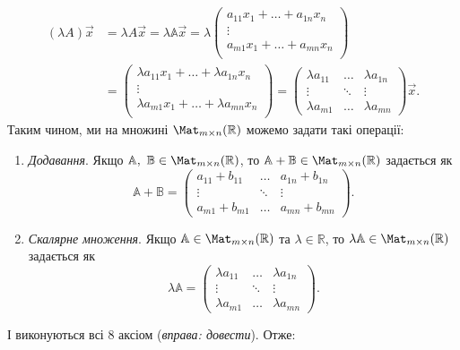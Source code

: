 \documentclass{math_library}
\begin{document}
	\begin{align*}
	(\lambda A)\vec{x} & = \lambda A \vec{x} = \lambda \mathbb{A} \vec{x} = \lambda \begin{pmatrix}
	a_{11}x_1 + \dots + a_{1n} x_n \\
	\vdots \\
	a_{m1}x_1 + \dots + a_{mn} x_n \\
	\end{pmatrix} \\
	& = \begin{pmatrix}
	\lambda a_{11}x_1 + \dots + \lambda a_{1n} x_n \\
	\vdots \\
	\lambda a_{m1} x_1 + \dots + \lambda a_{mn} x_n \\
	\end{pmatrix} = \begin{pmatrix}
	\lambda a_{11} & \dots & \lambda a_{1n}\\
	\vdots & \ddots & \vdots \\
	\lambda a_{m1} & \dots & \lambda a_{mn}
	\end{pmatrix} \vec{x}.
	\end{align*}
	Таким чином, ми на множині $\Mat_{m \times n}(\mathbb{R})$ можемо задати такі операції:
	\begin{enumerate}[nosep,wide=0pt,label={\Roman*.}]
	\item \textit{Додавання}. Якщо $\mathbb{A},\ \mathbb{B} \in \Mat_{m \times n}(\mathbb{R})$, то $\mathbb{A} + \mathbb{B} \in \Mat_{m \times n}(\mathbb{R})$ задається як
	\[
	\mathbb{A} + \mathbb{B} = \begin{pmatrix}
	a_{11} + b_{11} & \dots & a_{1n} + b_{1n} \\
	\vdots & \ddots & \vdots \\
	a_{m1} + b_{m1} & \dots & a_{mn} + b_{mn}
	\end{pmatrix}.
	\]
	\item \textit{Скалярне множення}. Якщо $\mathbb{A} \in \Mat_{m \times n}(\mathbb{R})$ та $\lambda \in \mathbb{R}$, то $\lambda \mathbb{A} \in \Mat_{m \times n}(\mathbb{R})$ задається як
	\[
	\lambda \mathbb{A} = \begin{pmatrix}
	\lambda a_{11} & \dots & \lambda a_{1n}\\
	\vdots & \ddots & \vdots \\
	\lambda a_{m1} & \dots & \lambda a_{mn}
	\end{pmatrix}.
	\]
	\end{enumerate}
	І виконуються всі 8 аксіом (\textit{вправа: довести}). Отже:
	
\end{document}
